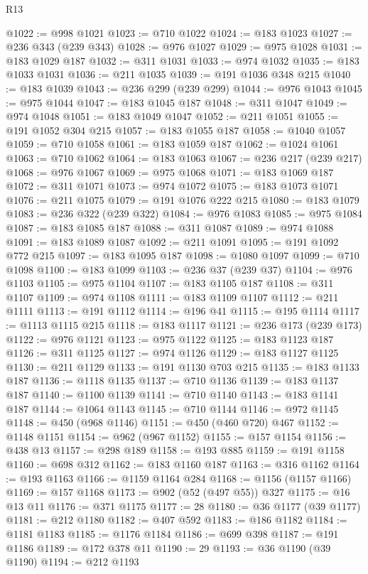 \begin{lexlean}{R13}
\begin{coremodule}
@1022 := @998 @1021
@1023 := @710 @1022
@1024 := @183 @1023
@1027 := @236 @343 (@239 @343)
@1028 := @976 @1027
@1029 := @975 @1028
@1031 := @183 @1029 @187
@1032 := @311 @1031
@1033 := @974 @1032
@1035 := @183 @1033 @1031
@1036 := @211 @1035
@1039 := @191 @1036 @348 @215
@1040 := @183 @1039
@1043 := @236 @299 (@239 @299)
@1044 := @976 @1043
@1045 := @975 @1044
@1047 := @183 @1045 @187
@1048 := @311 @1047
@1049 := @974 @1048
@1051 := @183 @1049 @1047
@1052 := @211 @1051
@1055 := @191 @1052 @304 @215
@1057 := @183 @1055 @187
@1058 := @1040 @1057
@1059 := @710 @1058
@1061 := @183 @1059 @187
@1062 := @1024 @1061
@1063 := @710 @1062
@1064 := @183 @1063
@1067 := @236 @217 (@239 @217)
@1068 := @976 @1067
@1069 := @975 @1068
@1071 := @183 @1069 @187
@1072 := @311 @1071
@1073 := @974 @1072
@1075 := @183 @1073 @1071
@1076 := @211 @1075
@1079 := @191 @1076 @222 @215
@1080 := @183 @1079
@1083 := @236 @322 (@239 @322)
@1084 := @976 @1083
@1085 := @975 @1084
@1087 := @183 @1085 @187
@1088 := @311 @1087
@1089 := @974 @1088
@1091 := @183 @1089 @1087
@1092 := @211 @1091
@1095 := @191 @1092 @772 @215
@1097 := @183 @1095 @187
@1098 := @1080 @1097
@1099 := @710 @1098
@1100 := @183 @1099
@1103 := @236 @37 (@239 @37)
@1104 := @976 @1103
@1105 := @975 @1104
@1107 := @183 @1105 @187
@1108 := @311 @1107
@1109 := @974 @1108
@1111 := @183 @1109 @1107
@1112 := @211 @1111
@1113 := @191 @1112
@1114 := @196 @41
@1115 := @195 @1114
@1117 := @1113 @1115 @215
@1118 := @183 @1117
@1121 := @236 @173 (@239 @173)
@1122 := @976 @1121
@1123 := @975 @1122
@1125 := @183 @1123 @187
@1126 := @311 @1125
@1127 := @974 @1126
@1129 := @183 @1127 @1125
@1130 := @211 @1129
@1133 := @191 @1130 @703 @215
@1135 := @183 @1133 @187
@1136 := @1118 @1135
@1137 := @710 @1136
@1139 := @183 @1137 @187
@1140 := @1100 @1139
@1141 := @710 @1140
@1143 := @183 @1141 @187
@1144 := @1064 @1143
@1145 := @710 @1144
@1146 := @972 @1145
@1148 := @450 (@968 @1146)
@1151 := @450 (@460 @720) @467
@1152 := @1148 @1151
@1154 := @962 (@967 @1152)
@1155 := @157 @1154
@1156 := @438 @13
@1157 := @298 @189
@1158 := @193 @885
@1159 := @191 @1158
@1160 := @698 @312
@1162 := @183 @1160 @187
@1163 := @316 @1162
@1164 := @193 @1163
@1166 := @1159 @1164 @284
@1168 := @1156 (@1157 @1166)
@1169 := @157 @1168
@1173 := @902 (@52 (@497 @55)) @327
@1175 := @16 @13 @11
@1176 := @371 @1175
@1177 := 28
@1180 := @36 @1177 (@39 @1177)
@1181 := @212 @1180
@1182 := @407 @592
@1183 := @186 @1182
@1184 := @1181 @1183
@1185 := @1176 @1184
@1186 := @699 @398
@1187 := @191 @1186
@1189 := @172 @378 @11
@1190 := 29
@1193 := @36 @1190 (@39 @1190)
@1194 := @212 @1193

\end{coremodule}
\end{lexlean}
